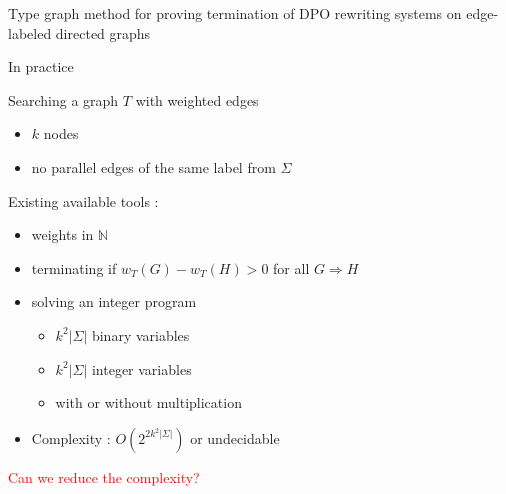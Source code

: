 \documentclass{beamer}
\begin{document}
\begin{frame}{Type graph method for proving termination of DPO rewriting systems on edge-labeled directed graphs}

    In practice

      Searching a graph \( T \) with weighted edges
      \begin{itemize}
        \item $k$ nodes
        \item no parallel edges of the same label from $\Sigma$
      \end{itemize} 
      
      Existing available tools : 
      \begin{itemize}
          \item weights in $\mathbb{N}$ 
          \item terminating if $w_T(G) - w_T(H) > 0$ for all $G \Rightarrow H$
          \item solving an integer program 
                \begin{itemize}
                  \item $k^2|\Sigma|$ binary variables
                  \item $k^2|\Sigma|$ integer variables
                  \item with or without multiplication
                \end{itemize} 
          \item Complexity : $O(2^{2k^2|\Sigma|})$ or undecidable
      \end{itemize}


    \textcolor{red}{Can we reduce the complexity?}
\end{frame}
\end{document}

